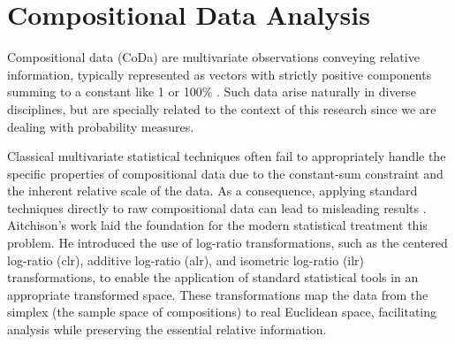 \documentclass[
	12pt,				%
	oneside,			%
	a4paper,			%
	english,			%
	brazil				%
	]{abntex2ppgsi}
\begin{document}




\section{Compositional Data Analysis}
Compositional data (CoDa) are multivariate observations conveying relative information, typically represented as vectors with strictly positive components summing to a constant like 1 or 100\% \cite{aitchison1982statistical}. Such data arise naturally in diverse disciplines, but are specially related to the context of this research since we are dealing with probability measures.

Classical multivariate statistical techniques often fail to appropriately handle the specific properties of compositional data due to the constant-sum constraint and the inherent relative scale of the data. As a consequence, applying standard techniques directly to raw compositional data can lead to misleading results \cite{pawlowsky2015modelling}. Aitchison's work \cite{aitchison1986statistical} laid the foundation for the modern statistical treatment this problem. He introduced the use of log-ratio transformations, such as the centered log-ratio (clr), additive log-ratio (alr), and isometric log-ratio (ilr) transformations, to enable the application of standard statistical tools in an appropriate transformed space. These transformations map the data from the simplex (the sample space of compositions) to real Euclidean space, facilitating analysis while preserving the essential relative information.
\end{document}
